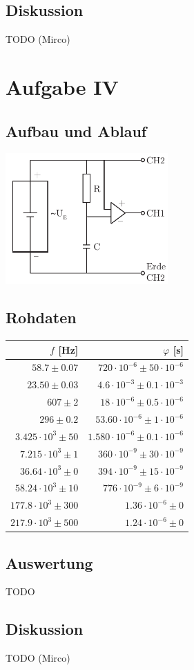 \documentclass[12pt,a4paper]{article}
\begin{document}
\subsection*{Diskussion}
TODO (Mirco)


\section*{Aufgabe IV}
\subsection*{Aufbau und Ablauf}
\includegraphics[height=5cm]{illustration4.pdf}

\subsection*{Rohdaten}
\begin{tabular}{|r|r|}
\hline
$f$ [Hz]&$\varphi$ [s]\\
\hline
$58.7 \pm 0.07$&$720\cdot 10^{-6} \pm 50\cdot 10^{-6}$\\
$23.50 \pm 0.03$&$4.6\cdot 10^{-3} \pm 0.1\cdot 10^{-3}$\\
$607 \pm 2$&$18\cdot 10^{-6} \pm 0.5\cdot 10^{-6}$\\
$296 \pm 0.2$&$53.60\cdot 10^{-6} \pm 1\cdot 10^{-6}$\\
$3.425\cdot 10^{3} \pm 50$&$1.580\cdot 10^{-6} \pm 0.1\cdot 10^{-6}$\\
$7.215\cdot 10^{3} \pm 1$&$360\cdot 10^{-9} \pm 30\cdot 10^{-9}$\\
$36.64\cdot 10^{3} \pm 0$&$394\cdot 10^{-9} \pm 15\cdot 10^{-9}$\\
$58.24\cdot 10^{3} \pm 10$&$776\cdot 10^{-9} \pm 6\cdot 10^{-9}$\\
$177.8\cdot 10^{3} \pm 300$&$1.36\cdot 10^{-6} \pm 0$\\
$217.9\cdot 10^{3} \pm 500$&$1.24\cdot 10^{-6} \pm 0$\\
\hline
\end{tabular}

\subsection*{Auswertung}
TODO

\subsection*{Diskussion}
TODO (Mirco)
\end{document}

